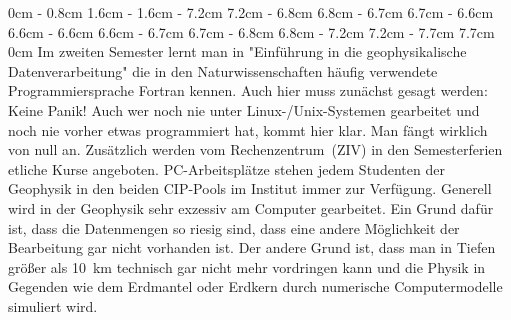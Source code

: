 \begin{multicols}{2}
{}
0cm \columnwidth
0cm \columnwidth
0cm \columnwidth
0cm \columnwidth
0cm \columnwidth
0cm \columnwidth
0cm \columnwidth
0cm \columnwidth
0cm \columnwidth
0cm \columnwidth
0cm \columnwidth
0cm \columnwidth
0.8cm \dimexpr\columnwidth - 0.8cm
1.6cm \dimexpr\columnwidth - 1.6cm
\dimexpr\columnwidth - 7.2cm 7.2cm
\dimexpr\columnwidth - 6.8cm 6.8cm
\dimexpr\columnwidth - 6.7cm 6.7cm
\dimexpr\columnwidth - 6.6cm 6.6cm
\dimexpr\columnwidth - 6.6cm 6.6cm
\dimexpr\columnwidth - 6.7cm 6.7cm
\dimexpr\columnwidth - 6.8cm 6.8cm
\dimexpr\columnwidth - 7.2cm 7.2cm
\dimexpr\columnwidth - 7.7cm 7.7cm
0cm \columnwidth
Im zweiten Semester lernt man in "Einführung in die geophysikalische Datenverarbeitung" die in den Naturwissenschaften häufig verwendete Programmiersprache Fortran kennen.
Auch hier muss zunächst gesagt werden: Keine Panik! Auch wer noch nie unter Linux-/Unix-Systemen gearbeitet und noch nie vorher etwas programmiert hat, kommt hier klar.
Man fängt wirklich von null an.
Zusätzlich werden vom Rechenzentrum~(ZIV) in den Semesterferien etliche Kurse angeboten.
PC-Arbeitsplätze stehen jedem Studenten der Geophysik in den beiden CIP-Pools im Institut immer zur Verfügung.
Generell wird in der Geophysik sehr exzessiv am Computer gearbeitet.
Ein Grund dafür ist, dass die Datenmengen so riesig sind, dass eine andere Möglichkeit der Bearbeitung gar nicht vorhanden ist.
Der andere Grund ist, dass man in Tiefen größer als \SI{10}{\km} technisch gar nicht mehr vordringen kann und die Physik in Gegenden wie dem Erdmantel oder Erdkern durch numerische Computermodelle simuliert wird.


\end{multicols}
